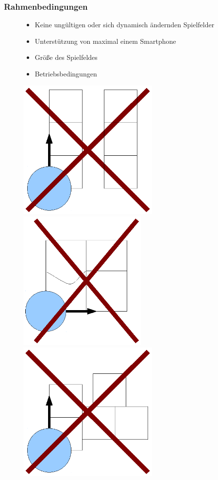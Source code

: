 \documentclass{beamer}
\begin{document}
\begin{frame}
  \frametitle{Rahmenbedingungen}
		\begin{figure}[htbp]
			\begin{minipage}[]{7cm}
				\begin{itemize}
					\vspace{0pt}
					\item Keine ungültigen oder sich dynamisch ändernden Spielfelder
					\item Unterstützung von maximal einem Smartphone
					\item Größe des Spielfeldes
					\item Betriebsbedingungen
				\end{itemize} 
			\end{minipage}
			\begin{minipage}[t]{21cm}
				\vspace{30pt}
				\includegraphics[height=7cm]{ungueltig1.eps}
				\includegraphics[height=7cm]{ungueltig2.eps} 
				\includegraphics[height=7cm]{ungueltig3.eps} 
			\end{minipage}
   		\end{figure}
		

\end{frame}
\end{document}
